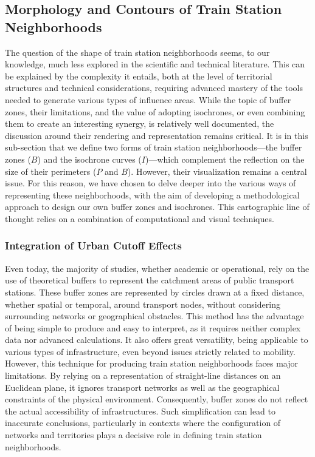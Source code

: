 \begin{refsegment}
\subsection{Morphology and Contours of Train Station Neighborhoods
    \label{chap3:quartiers-gare-formes}
    }

The question of the shape of train station neighborhoods seems, to our knowledge, much less explored in the scientific and technical literature. This can be explained by the complexity it entails, both at the level of territorial structures and technical considerations, requiring advanced mastery of the tools needed to generate various types of influence areas. While the topic of buffer zones, their limitations, and the value of adopting isochrones, or even combining them to create an interesting synergy, is relatively well documented, the discussion around their rendering and representation remains critical. It is in this sub-section that we define two forms of train station neighborhoods—the buffer zones (\(B\)) and the isochrone curves (\(I\))—which complement the reflection on the size of their perimeters (\(P\) and \(B\)). However, their visualization remains a central issue. For this reason, we have chosen to delve deeper into the various ways of representing these neighborhoods, with the aim of developing a methodological approach to design our own buffer zones and isochrones. This cartographic line of thought relies on a combination of computational and visual techniques.%

\subsubsection*{Integration of Urban Cutoff Effects
    \label{chap3:quartiers-gare-isochrones-buffers}
    }

Even today, the majority of studies, whether academic or operational, rely on the use of theoretical buffers to represent the catchment areas of public transport stations. These buffer zones are represented by circles drawn at a fixed distance, whether spatial or temporal, around transport nodes, without considering surrounding networks or geographical obstacles. This method has the advantage of being simple to produce and easy to interpret, as it requires neither complex data nor advanced calculations. It also offers great versatility, being applicable to various types of infrastructure, even beyond issues strictly related to mobility. However, this technique for producing train station neighborhoods faces major limitations. By relying on a representation of straight-line distances on an Euclidean plane, it ignores transport networks as well as the geographical constraints of the physical environment. Consequently, buffer zones do not reflect the actual accessibility of infrastructures. Such simplification can lead to inaccurate conclusions, particularly in contexts where the configuration of networks and territories plays a decisive role in defining train station neighborhoods.%


\end{refsegment}
